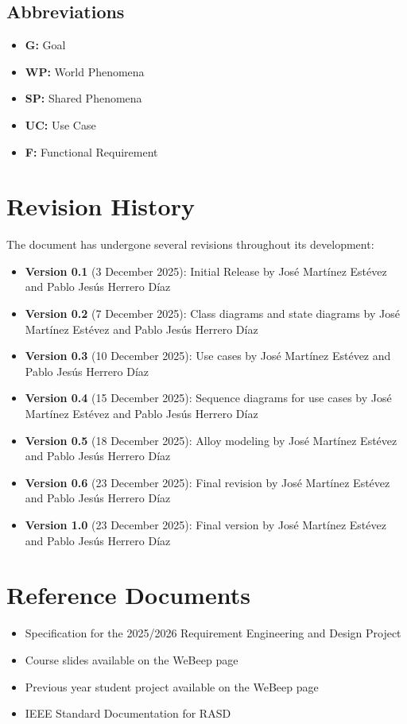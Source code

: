 \subsection{Abbreviations}
\label{subsec:abbreviations}%
\begin{itemize}
    \item \textbf{G:} Goal
    \item \textbf{WP:} World Phenomena
    \item \textbf{SP:} Shared Phenomena
    \item \textbf{UC:} Use Case
    \item \textbf{F:} Functional Requirement
\end{itemize}

\section{Revision History}
\label{sec:revision_history}

The document has undergone several revisions throughout its development:

\begin{itemize}
    \item \textbf{Version 0.1} (3 December 2025): Initial Release by José Martínez Estévez and Pablo Jesús Herrero Díaz
    \item \textbf{Version 0.2} (7 December 2025): Class diagrams and state diagrams by José Martínez Estévez and Pablo Jesús Herrero Díaz
    \item \textbf{Version 0.3} (10 December 2025): Use cases by José Martínez Estévez and Pablo Jesús Herrero Díaz
    \item \textbf{Version 0.4} (15 December 2025): Sequence diagrams for use cases by José Martínez Estévez and Pablo Jesús Herrero Díaz
    \item \textbf{Version 0.5} (18 December 2025): Alloy modeling by José Martínez Estévez and Pablo Jesús Herrero Díaz
    \item \textbf{Version 0.6} (23 December 2025): Final revision by José Martínez Estévez and Pablo Jesús Herrero Díaz
    \item \textbf{Version 1.0} (23 December 2025): Final version by José Martínez Estévez and Pablo Jesús Herrero Díaz
\end{itemize}

\section{Reference Documents}
\label{sec:reference_documents}%
\begin{itemize}
    \item Specification for the 2025/2026 Requirement Engineering and Design Project
    \item Course slides available on the WeBeep page 
    \item Previous year student project available on the WeBeep page
    \item IEEE Standard Documentation for RASD
\end{itemize}

